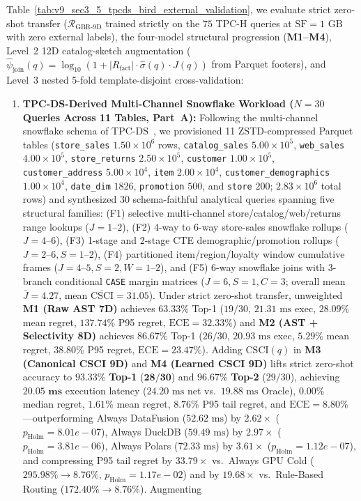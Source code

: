 \documentclass[10pt,a4paper]{article}
\begin{document}
Table~\ref{tab:v9_sec3_5_tpcds_bird_external_validation}, we evaluate strict zero-shot transfer ($\mathcal{R}_{\text{GBR-9D}}$ trained strictly on the $75$ TPC-H queries at $\text{SF}=1\text{ GB}$ with zero external labels), the four-model structural progression (\textbf{M1--M4}), Level~2 12D catalog-sketch augmentation ($\hat{\psi}_{\text{join}}(q) = \log_{10}(1 + |R_{\text{fact}}|\cdot\hat{\sigma}(q)\cdot J(q))$ from Parquet footers), and Level~3 nested 5-fold template-disjoint cross-validation:
\begin{enumerate}[leftmargin=1.5em,itemsep=0.8pt]
    \item \textbf{TPC-DS-Derived Multi-Channel Snowflake Workload ($N=30$ Queries Across 11 Tables, Part~A):} Following the multi-channel snowflake schema of TPC-DS~\cite{nambiar2006tpcds}, we provisioned 11 ZSTD-compressed Parquet tables (\texttt{store\_sales} $1.50\times 10^6$ rows, \texttt{catalog\_sales} $5.00\times 10^5$, \texttt{web\_sales} $4.00\times 10^5$, \texttt{store\_returns} $2.50\times 10^5$, \texttt{customer} $1.00\times 10^5$, \texttt{customer\_address} $5.00\times 10^4$, \texttt{item} $2.00\times 10^4$, \texttt{customer\_demographics} $1.00\times 10^4$, \texttt{date\_dim} $1826$, \texttt{promotion} $500$, and \texttt{store} $200$; $2.83\times 10^6$ total rows) and synthesized 30 schema-faithful analytical queries spanning five structural families: (F1) selective multi-channel store/catalog/web/returns range lookups ($J=1\text{--}2$), (F2) 4-way to 6-way store-sales snowflake rollups ($J=4\text{--}6$), (F3) 1-stage and 2-stage CTE demographic/promotion rollups ($J=2\text{--}6, S=1\text{--}2$), (F4) partitioned item/region/loyalty window cumulative frames ($J=4\text{--}5, S=2, W=1\text{--}2$), and (F5) 6-way snowflake joins with 3-branch conditional \texttt{CASE} margin matrices ($J=6, S=1, C=3$; overall mean $\bar{J}=4.27$, mean $\overline{\text{CSCI}}=31.05$). Under strict zero-shot transfer, unweighted \textbf{M1 (Raw AST 7D)} achieves $63.33\%$ Top-1 ($19/30$, $21.31\text{ ms}$ exec, $28.09\%$ mean regret, $137.74\%$ P95 regret, $\text{ECE}=32.33\%$) and \textbf{M2 (AST + Selectivity 8D)} achieves $86.67\%$ Top-1 ($26/30$, $20.93\text{ ms}$ exec, $5.29\%$ mean regret, $38.80\%$ P95 regret, $\text{ECE}=23.47\%$). Adding $\text{CSCI}(q)$ in \textbf{M3 (Canonical CSCI 9D)} and \textbf{M4 (Learned CSCI 9D)} lifts strict zero-shot accuracy to $\mathbf{93.33\%}$ \textbf{Top-1} ($\mathbf{28/30}$) and $\mathbf{96.67\%}$ \textbf{Top-2} ($29/30$), achieving $\mathbf{20.05\text{ ms}}$ execution latency ($24.20\text{ ms}$ net vs.\ $19.88\text{ ms}$ Oracle), $\mathbf{0.00\%}$ median regret, $\mathbf{1.61\%}$ mean regret, $\mathbf{8.76\%}$ P95 tail regret, and $\text{ECE}=\mathbf{8.80\%}$---outperforming Always DataFusion ($52.62\text{ ms}$) by $\mathbf{2.62\times}$ ($p_{\text{Holm}}=8.01e-07$), Always DuckDB ($59.49\text{ ms}$) by $\mathbf{2.97\times}$ ($p_{\text{Holm}}=3.81e-06$), Always Polars ($72.33\text{ ms}$) by $\mathbf{3.61\times}$ ($p_{\text{Holm}}=1.12e-07$), and compressing P95 tail regret by $\mathbf{33.79\times}$ vs.\ Always GPU Cold ($295.98\%\rightarrow 8.76\%$, $p_{\text{Holm}}=1.17e-02$) and by $\mathbf{19.68\times}$ vs.\ Rule-Based Routing ($172.40\%\rightarrow 8.76\%$). Augmenting 
\end{enumerate}
\end{document}
